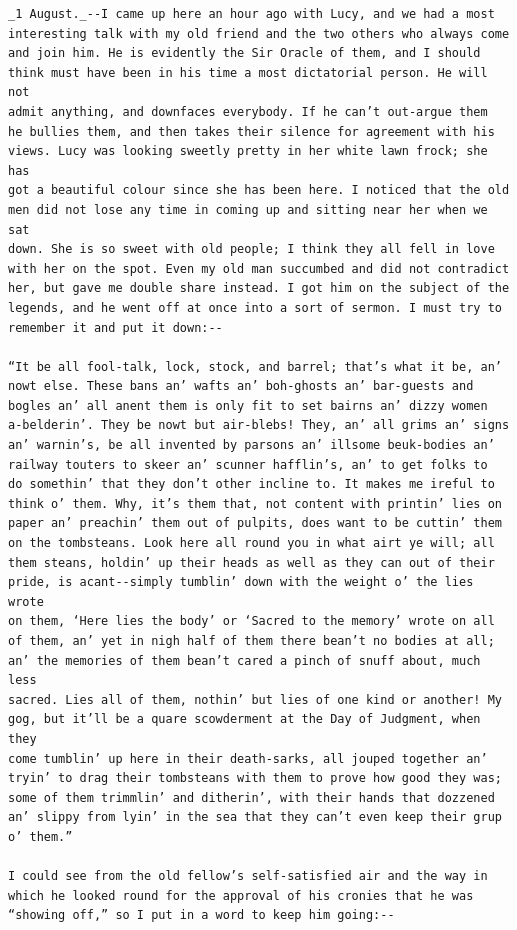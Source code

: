 \documentclass{article}
\begin{document}
\begin{verbatim}
_1 August._--I came up here an hour ago with Lucy, and we had a most
interesting talk with my old friend and the two others who always come
and join him. He is evidently the Sir Oracle of them, and I should
think must have been in his time a most dictatorial person. He will not
admit anything, and downfaces everybody. If he can’t out-argue them
he bullies them, and then takes their silence for agreement with his
views. Lucy was looking sweetly pretty in her white lawn frock; she has
got a beautiful colour since she has been here. I noticed that the old
men did not lose any time in coming up and sitting near her when we sat
down. She is so sweet with old people; I think they all fell in love
with her on the spot. Even my old man succumbed and did not contradict
her, but gave me double share instead. I got him on the subject of the
legends, and he went off at once into a sort of sermon. I must try to
remember it and put it down:--

“It be all fool-talk, lock, stock, and barrel; that’s what it be, an’
nowt else. These bans an’ wafts an’ boh-ghosts an’ bar-guests and
bogles an’ all anent them is only fit to set bairns an’ dizzy women
a-belderin’. They be nowt but air-blebs! They, an’ all grims an’ signs
an’ warnin’s, be all invented by parsons an’ illsome beuk-bodies an’
railway touters to skeer an’ scunner hafflin’s, an’ to get folks to
do somethin’ that they don’t other incline to. It makes me ireful to
think o’ them. Why, it’s them that, not content with printin’ lies on
paper an’ preachin’ them out of pulpits, does want to be cuttin’ them
on the tombsteans. Look here all round you in what airt ye will; all
them steans, holdin’ up their heads as well as they can out of their
pride, is acant--simply tumblin’ down with the weight o’ the lies wrote
on them, ‘Here lies the body’ or ‘Sacred to the memory’ wrote on all
of them, an’ yet in nigh half of them there bean’t no bodies at all;
an’ the memories of them bean’t cared a pinch of snuff about, much less
sacred. Lies all of them, nothin’ but lies of one kind or another! My
gog, but it’ll be a quare scowderment at the Day of Judgment, when they
come tumblin’ up here in their death-sarks, all jouped together an’
tryin’ to drag their tombsteans with them to prove how good they was;
some of them trimmlin’ and ditherin’, with their hands that dozzened
an’ slippy from lyin’ in the sea that they can’t even keep their grup
o’ them.”

I could see from the old fellow’s self-satisfied air and the way in
which he looked round for the approval of his cronies that he was
“showing off,” so I put in a word to keep him going:--


\end{verbatim}
\end{document}
